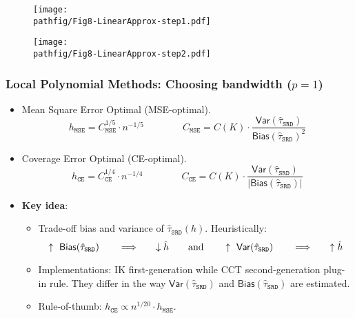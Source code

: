 \documentclass[9pt]{beamer}
\newcommand{\pathfig}{figures}
\begin{document}
\begin{frame}
	\begin{figure}[h]
		\centering
		\texttt{[image: \\pathfig/Fig8-LinearApprox-step1.pdf]}
	\end{figure}
\end{frame}

\begin{frame}
	\begin{figure}[h]
		\centering
		\texttt{[image: \\pathfig/Fig8-LinearApprox-step2.pdf]}
	\end{figure}
\end{frame}

\begin{frame}\frametitle{Local Polynomial Methods: Choosing bandwidth ($p=1$)}
	\begin{itemize}
		\item Mean Square Error Optimal (MSE-optimal).
		\[h_{\mathtt{MSE}} = C_{\mathtt{MSE}}^{1/5}\cdot n^{-1/5}\qquad\qquad
		  C_{\mathtt{MSE}} = C(K)\cdot\frac{\mathsf{Var}(\hat{\tau}_{\mathtt{SRD}})}{\mathsf{Bias}(\hat{\tau}_{\mathtt{SRD}})^{2}}\]\smallskip
		
		\item Coverage Error Optimal (CE-optimal).
		\[h_{\mathtt{CE}} = C_{\mathtt{CE}}^{1/4}\cdot n^{-1/4}\qquad\qquad
		  C_{\mathtt{CE}} = C(K)\cdot\frac{\mathsf{Var}(\hat{\tau}_{\mathtt{SRD}})}{|\mathsf{Bias}(\hat{\tau}_{\mathtt{SRD}})|}\]\smallskip		
		
		\item \textbf{Key idea}:\medskip
		\begin{itemize}
			\item Trade-off bias and variance of $\hat{\tau}_{\mathtt{SRD}}(h)$. Heuristically:
			\[\uparrow~\mathsf{Bias}(\hat{\tau}_{\mathtt{SRD}})\qquad\Longrightarrow\qquad\downarrow\hat{h}
			  \text{\qquad and\qquad}
			  \uparrow~\mathsf{Var}(\hat{\tau}_{\mathtt{SRD}})\qquad\Longrightarrow\qquad\uparrow\hat{h}\]\smallskip
			
			\item Implementations: IK  first-generation while CCT second-generation plug-in rule.\newline
			      They differ in the way $\mathsf{Var}(\hat{\tau}_{\mathtt{SRD}})$ and $\mathsf{Bias}(\hat{\tau}_{\mathtt{SRD}})$ are estimated.\medskip
			
			\item Rule-of-thumb: $h_{\mathtt{CE}} \propto n^{1/20} \cdot h_{\mathtt{MSE}}$.
			
		\end{itemize}
		
		
	\end{itemize}
\end{frame}
\end{document}
